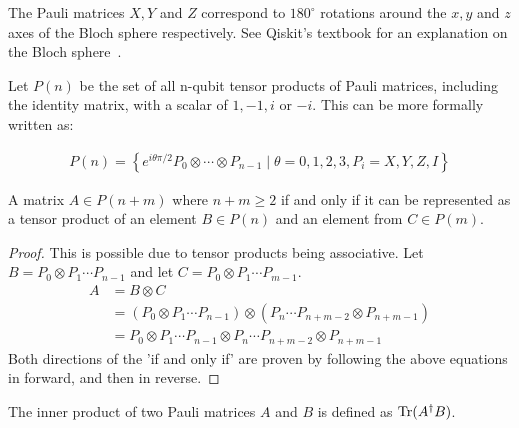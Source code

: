 The Pauli matrices $X,Y$ and $Z$ correspond to $180^{\circ}$ rotations around the $x,y$ and $z$ axes of the Bloch sphere respectively. See Qiskit's textbook for an explanation on the Bloch sphere~\cite{Qiskit-Textbook}.

Let $P(n)$ be the set of all n-qubit tensor products of Pauli matrices, including the identity matrix, with a scalar of $1, -1, i$ or $-i$. This can be more formally written as:

\begin{align}
\label{eq:pauliDefinition}
P(n)=\left\{ e^{i\theta\pi/2} P_0 \otimes \cdots \otimes P_{n-1} \mid \theta = 0,1,2,3, P_i = X,Y,Z,I\right\}
\end{align}

\begin{theorem}
\label{theoremPauli}
A matrix $A \in P(n + m)$ where $n + m \geq 2$ if and only if it can be represented as a tensor product of an element $B \in P(n)$ and an element from $C \in P(m)$.
\end{theorem}
\begin{proof}
This is possible due to tensor products being associative. Let $B = P_0 \otimes P_1 \cdots P_{n-1}$ and let $C =  P_0 \otimes P_1 \cdots P_{m-1}$.
\begin{align}
A &=B \otimes C \\
&= (P_0 \otimes P_1 \cdots P_{n-1}) \otimes (P_{n} \cdots P_{n+m-2} \otimes P_{n+m-1}) \\
&= P_0 \otimes P_1 \cdots P_{n-1} \otimes P_n \cdots P_{n+m-2} \otimes P_{n+m-1}
\end{align}
Both directions of the 'if and only if' are proven by following the above equations in forward, and then in reverse.
\end{proof}

The inner product of two Pauli matrices $A$ and $B$ is defined as $\operatorname{Tr} (A^{\dagger} B)$.

